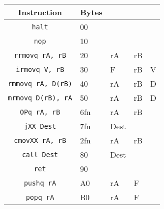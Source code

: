 \documentclass[10pt]{armath}
\newcommand{\s}[1]{\texttt{#1}}
\begin{document}
\begin{center}
  \begin{tabular}{c l l l l}
    Instruction & Bytes & & &\\\hline
    \s{halt} & 00 & & &\\
    \s{nop} & 10 & & &\\
    \s{rrmovq rA, rB} & 20 & rA & rB &\\
    \s{irmovq V, rB} & 30 & F & rB & V\\
    \s{rmmovq rA, D(rB)} & 40 & rA & rB & D\\
    \s{mrmovq D(rB), rA} & 50 & rA & rB & D\\
    \s{OPq rA, rB} & 6fn & rA & rB &\\
    \s{jXX Dest} & 7fn & Dest\\
    \s{cmovXX rA, rB} & 2fn & rA & rB\\
    \s{call Dest} & 80 & Dest\\
    \s{ret} & 90 & & &\\
    \s{pushq rA} & A0 & rA & F\\
    \s{popq rA} & B0 & rA & F\\\hline
  \end{tabular}
\end{center}
\end{document}
